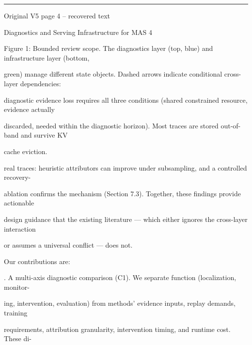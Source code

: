 \par\smallskip\noindent\rule{\textwidth}{0.4pt}\par{\sffamily\footnotesize Original V5 page 4 -- recovered text}\par\begin{flushleft}\footnotesize\ttfamily
\par\smallskip
\par\smallskip
\noindent Diagnostics and Serving Infrastructure for MAS 4\par
\par\smallskip
\par\smallskip
\par\smallskip
\par\smallskip
\noindent Figure 1: Bounded review scope. The diagnostics layer (top, blue) and infrastructure layer (bottom,\par
\noindent green) manage different state objects. Dashed arrows indicate conditional cross-layer dependencies:\par
\noindent diagnostic evidence loss requires all three conditions (shared constrained resource, evidence actually\par
\noindent discarded, needed within the diagnostic horizon). Most traces are stored out-of-band and survive KV\par
\noindent cache eviction.\par
\par\smallskip
\par\smallskip
\noindent real traces: heuristic attributors can improve under subsampling, and a controlled recovery-\par
\noindent ablation confirms the mechanism (Section 7.3). Together, these findings provide actionable\par
\noindent design guidance that the existing literature — which either ignores the cross-layer interaction\par
\noindent or assumes a universal conflict — does not.\par
\noindent  Our contributions are:\par
{}. A multi-axis diagnostic comparison (C1). We separate function (localization, monitor-\par
\noindent  ing, intervention, evaluation) from methods’ evidence inputs, replay demands, training\par
\noindent  requirements, attribution granularity, intervention timing, and runtime cost. These di-\par

\end{flushleft}
